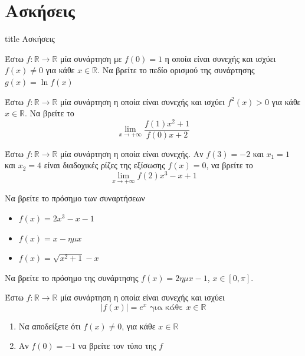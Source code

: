 \documentclass{presentation}
\begin{document}
\section{Ασκήσεις}

\begin{frame}[noframenumbering]
  \vfill
  \centering
  \begin{beamercolorbox}[sep=8pt,center,shadow=true,rounded=true]{title}
    Ασκήσεις
  \end{beamercolorbox}
  \vfill
\end{frame}

\begin{askisi}
  Έστω $f:\mathbb{R}\to\mathbb{R}$ μία συνάρτηση με $f(0)=1$ η οποία είναι συνεχής και ισχύει $f(x)\ne 0$ για κάθε $x\in\mathbb{R}$. Να βρείτε το πεδίο ορισμού της συνάρτησης $g(x)=\ln f(x)$
\end{askisi}

\begin{askisi}
  Έστω $f:\mathbb{R}\to\mathbb{R}$ μία συνάρτηση η οποία είναι συνεχής και ισχύει $f^2(x)>0$ για κάθε $x\in\mathbb{R}$. Να βρείτε το
  $$\lim\limits_{x \to +\infty}{ \frac{f(1)x^2+1}{f(0)x+2} }$$
\end{askisi}

\begin{askisi}
  Έστω $f:\mathbb{R}\to\mathbb{R}$ μία συνάρτηση η οποία είναι συνεχής. Αν $f(3)=-2$ και $x_1=1$ και $x_2=4$ είναι διαδοχικές ρίζες της εξίσωσης $f(x)=0$, να βρείτε το
  $$\lim\limits_{x \to +\infty}{ f(2)x^3-x+1 }$$
\end{askisi}

\begin{askisi}
  Να βρείτε το πρόσημο των συναρτήσεων
  \begin{itemize}[<+->]
    \item $f(x)=2x^3-x-1$
    \item $f(x)=x-ημx$
    \item $f(x)=\sqrt{x^2+1}-x$
  \end{itemize}
\end{askisi}

\begin{askisi}
  Να βρείτε το πρόσημο της συνάρτησης $f(x)=2ημx-1$, $x\in [0,π]$.
\end{askisi}

\begin{askisi}
  Έστω $f:\mathbb{R}\to\mathbb{R}$ μία συνάρτηση η οποία είναι συνεχής και ισχύει
  $$|f(x)|=e^x \text{ για κάθε } x\in\mathbb{R}$$
  \begin{enumerate}[<+->]
    \item Να αποδείξετε ότι $f(x)\ne 0$, για κάθε $x\in\mathbb{R}$
    \item Αν $f(0)=-1$ να βρείτε τον τύπο της $f$
  \end{enumerate}
\end{askisi}
\end{document}
